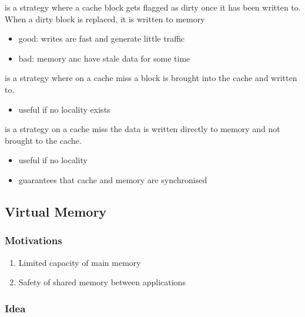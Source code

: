 \documentclass{article}
\begin{document}
\begin{definition}
	 is a strategy where a cache block gets flagged as
	dirty once it has been written to. When a dirty block is replaced,
	it is written to memory
	\begin{itemize}
		\item good: writes are fast and generate little traffic
		\item bad: memory anc have stale data for some time
	\end{itemize}
\end{definition}

\begin{definition}
	 is a strategy where on a cache miss a block 
	is brought into the cache and written to.
	\begin{itemize}
		\item useful if no locality exists
	\end{itemize}
\end{definition}

\begin{definition}
	 is a strategy on a cache miss the data is
	written directly to memory and not brought to the cache.
	\begin{itemize}
		\item useful if no locality
		\item guarantees that cache and memory are synchronised
	\end{itemize}
\end{definition}


\subsection{Virtual Memory}


\subsubsection{Motivations}

\begin{enumerate}
	\item Limited capacity of main memory
	\item Safety of shared memory between applications
\end{enumerate}

\subsubsection{Idea}
\end{document}
